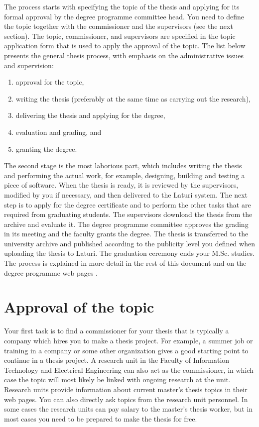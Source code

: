 The process starts with specifying the topic of the thesis and applying for its formal approval by the degree programme committee head. You need to define the topic together with the commissioner and the supervisors (see the next section). The topic, commissioner, and supervisors are specified in the topic application form that is used to apply the approval of the topic. The list below presents the general thesis process, with emphasis on the administrative issues and supervision:

\begin{enumerate}
    \setlength\itemsep{0pt}
    \setlength\parskip{0pt}
    \item approval for the topic,
    \item writing the thesis (preferably at the same time as carrying out the research),
    \item delivering the thesis and applying for the degree,
    \item evaluation and grading, and
    \item granting the degree.
\end{enumerate}

The second stage is the most laborious part, which includes writing the thesis and performing the actual work, for example, designing, building and testing a piece of software. When the thesis is ready, it is reviewed by the supervisors, modified by you if necessary, and then delivered to the Laturi system. The next step is to apply for the degree certificate and to perform the other tasks that are required from graduating students. The supervisors download the thesis from the archive and evaluate it. The degree programme committee approves the grading in its meeting and the faculty grants the degree. The thesis is transferred to the university archive and published according to the publicity level you defined when uploading the thesis to Laturi. The graduation ceremony ends your M.Sc. studies. The process is explained in more detail in the rest of this document and on the degree programme web pages \cite{mscstudies}.

\section{Approval of the topic}

Your first task is to find a commissioner for your thesis that is typically a company which hires you to make a thesis project. For example, a summer job or training in a company or some other organization gives a good starting point to continue in a thesis project. A research unit in the Faculty of Information Technology and Electrical Engineering can also act as the commissioner, in which case the topic will most likely be linked with ongoing research at the unit. Research units provide information about current master’s thesis topics in their web pages. You can also directly ask topics from the research unit personnel. In some cases the research units can pay salary to the master’s thesis worker, but in most cases you need to be prepared to make the thesis for free.

